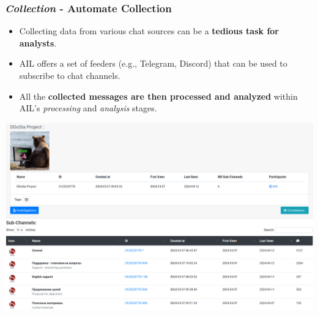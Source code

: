 \documentclass[10pt,aspectratio=169, colorlinks=true, linkcolor=circlBlue]{beamer}
\begin{document}
\begin{frame}
    \frametitle{\textit{Collection} - Automate Collection}
    \begin{itemize}
        \item Collecting data from various chat sources can be a \textbf{tedious task for analysts}.
        \item AIL offers a set of feeders (e.g., Telegram, Discord) that can be used to subscribe to chat channels.
        \item All the \textbf{collected messages are then processed and analyzed} within AIL's \textit{processing} and \textit{analysis} stages.
    \end{itemize}
    \begin{center}
        \includegraphics[scale=0.18]{screenshot/chat-forum.png}
    \end{center}
\end{frame}

\end{document}
